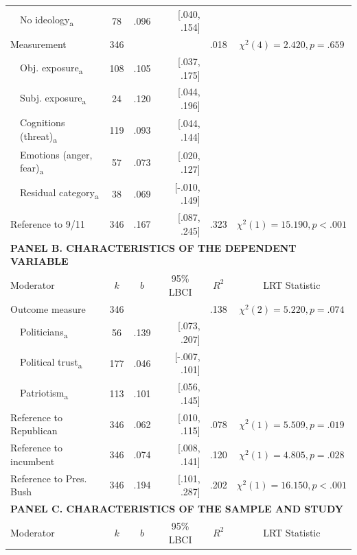 \begin{ThreePartTable}
\begin{longtable}[c]{llcrrcc}
 & No ideology\textsubscript{a} & 78 & .096 & [.040, .154] &  &  \\
\multicolumn{2}{l}{Measurement} & 346 &  &  & .018 & $\chi^2(4)=2.420, p=.659$ \\
 & Obj. exposure\textsubscript{a} & 108 & .105 & [.037, .175] &  &  \\
 & Subj. exposure\textsubscript{a} & 24 & .120 & [.044, .196] &  &  \\
 & Cognitions (threat)\textsubscript{a} & 119 & .093 & [.044, .144] &  &  \\
 & Emotions (anger, fear)\textsubscript{a} & 57 & .073 & [.020, .127] &  &  \\
 & Residual category\textsubscript{a} & 38 & .069 & [-.010, .149] &  &  \\
\multicolumn{2}{l}{Reference to 9/11} & 346 & .167 & [.087, .245] & .323 & $\chi^2(1)=15.190, p<.001$ \\ [1.5ex] \hline
 \multicolumn{7}{l}{\textbf{PANEL B. CHARACTERISTICS OF THE DEPENDENT VARIABLE}} \\ \hline
 \multicolumn{2}{l}{{Moderator}} & \multicolumn{1}{c}{{$k$}} & \multicolumn{1}{c}{{$b$}} & \multicolumn{1}{c}{{95\% LBCI}} & \multicolumn{1}{c}{{$R^2$}} & \multicolumn{1}{c}{{LRT Statistic}} \\ \hline
\multicolumn{2}{l}{Outcome measure} & 346 &  &  & .138 & $\chi^2(2)=5.220, p=.074$ \\
 & Politicians\textsubscript{a} & 56 & .139 & [.073, .207] &  &  \\
 & Political trust\textsubscript{a} & 177 & .046 & [-.007, .101] &  &  \\
 & Patriotism\textsubscript{a} & 113 & .101 & [.056, .145] &  &  \\
\multicolumn{2}{l}{Reference to Republican} & 346 & .062 & [.010, .115] & .078 & $\chi^2(1)=5.509, p=.019$ \\
\multicolumn{2}{l}{Reference to incumbent} & 346 & .074 & [.008, .141] & .120 & $\chi^2(1)=4.805, p=.028$ \\
\multicolumn{2}{l}{Reference to Pres. Bush} & 346 & .194 & [.101, .287] & .202 & $\chi^2(1)=16.150, p<.001$ \\ [1.5ex] \hline
 \multicolumn{7}{l}{\textbf{PANEL C. CHARACTERISTICS OF THE SAMPLE AND STUDY}} \\ \hline
 \multicolumn{2}{l}{{Moderator}} & \multicolumn{1}{c}{{$k$}} & \multicolumn{1}{c}{{$b$}} & \multicolumn{1}{c}{{95\% LBCI}} & \multicolumn{1}{c}{{$R^2$}} & \multicolumn{1}{c}{{LRT Statistic}} \\ \hline

\end{longtable}
\end{ThreePartTable}
